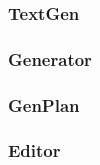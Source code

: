 \subsubsection{TextGen}
\lipsum[5]

\subsubsection{Generator}
\lipsum[5]

\subsubsection{GenPlan}
\lipsum[5]

\subsubsection{Editor}
\lipsum[5]
